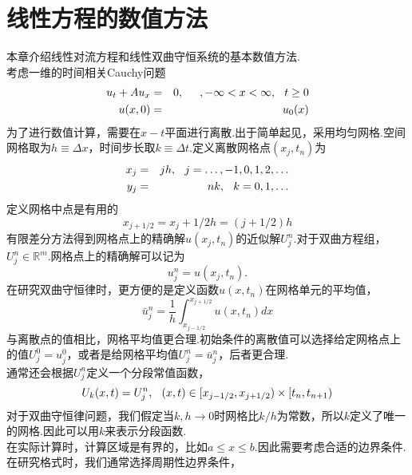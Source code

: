 \chapter{线性方程的数值方法}
本章介绍线性对流方程和线性双曲守恒系统的基本数值方法. \\
考虑一维的时间相关Cauchy问题
\begin{eqnarray} \label{lin-hyp-eq}
	u_t + Au_x &=& 0, \hspace{0.2in},-\infty < x < \infty,\hspace{0.1in} t\ge 0 \\
	u(x,0) &=& u_0(x)
\end{eqnarray}
为了进行数值计算，需要在$x-t$平面进行离散.出于简单起见，采用均匀网格.空间网格取为$h \equiv \Delta x$，时间步长取$k \equiv \Delta t$.定义离散网格点$(x_j,t_n)$为
\begin{eqnarray}
	x_j &=& jh, \hspace{0.1in} j =\ldots,-1,0,1,2,\ldots \\
	y_j &=& nk, \hspace{0.1in} k = 0,1,\ldots 
\end{eqnarray}
定义网格中点是有用的
\begin{equation}
	x_{j+1/2} = x_j + 1/2h = (j+1/2)h
\end{equation}
有限差分方法得到网格点上的精确解$u(x_j,t_n)$的近似解$U_j^n$.对于双曲方程组，$U_j^n \in \mathbb{R}^m$.网格点上的精确解可以记为
\begin{equation}
	u_j^n = u(x_j,t_n).
\end{equation}
在研究双曲守恒律时，更方便的是定义函数$u(x,t_n)$在网格单元的平均值，
\begin{equation}
	\bar{u}_j^n = \frac{1}{h}\int_{x_{j-1/2}}^{x_{j+1/2}} u(x,t_n) dx
\end{equation}
与离散点的值相比，网格平均值更合理.初始条件的离散值可以选择给定网格点上的值$U_j^0=u_j^0$，或者是给网格平均值$U_j^n=\bar{u}_j^n$，后者更合理.\\
通常还会根据$U_j^n$定义一个分段常值函数，
\begin{equation} \label{piece-const-function}
	U_k(x,t)=U_j^n,\hspace{0.1in} (x,t)\in[x_{j-1/2},x_{j+1/2}) \times [t_n,t_{n+1}) 
\end{equation}
对于双曲守恒律问题，我们假定当$k,h \to 0$时网格比$k/h$为常数，所以$k$定义了唯一的网格.因此可以用$k$来表示分段函数.\\
在实际计算时，计算区域是有界的，比如$a\le x \le b$.因此需要考虑合适的边界条件.在研究格式时，我们通常选择周期性边界条件，
